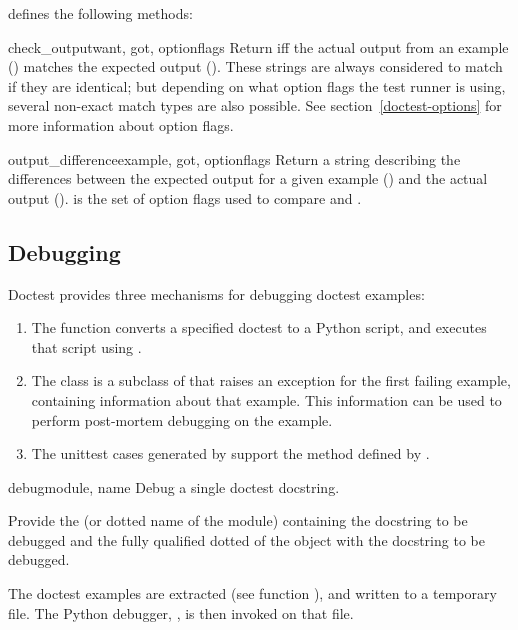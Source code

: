  defines the following methods:

\begin{methoddesc}{check_output}{want, got, optionflags}
    Return  iff the actual output from an example
    () matches the expected output ().  These
    strings are always considered to match if they are identical; but
    depending on what option flags the test runner is using, several
    non-exact match types are also possible.  See
    section~\ref{doctest-options} for more information about option
    flags.
\end{methoddesc}

\begin{methoddesc}{output_difference}{example, got, optionflags}
    Return a string describing the differences between the expected
    output for a given example () and the actual output
    ().   is the set of option flags used to
    compare  and .
\end{methoddesc}

\subsection{Debugging\label{doctest-debugging}}

Doctest provides three mechanisms for debugging doctest examples:

\begin{enumerate}
\item The  function converts a specified doctest
      to a Python script, and executes that script using .
\item The  class is a subclass of
       that raises an exception for the first
      failing example, containing information about that example.
      This information can be used to perform post-mortem debugging on
      the example.
\item The unittest cases generated by 
      support the  method defined by
      .
\end{enumerate}

\begin{funcdesc}{debug}{module, name}
  Debug a single doctest docstring.

  Provide the  (or dotted name of the module) containing
  the docstring to be debugged and the fully qualified dotted
   of the object with the docstring to be debugged.

  The doctest examples are extracted (see function ),
  and written to a temporary file.  The Python debugger, ,
  is then invoked on that file.
\end{funcdesc}

